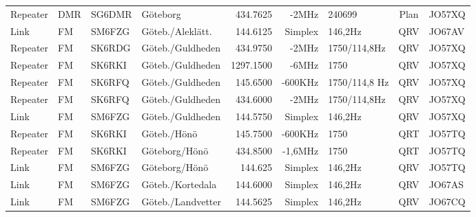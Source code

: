 \begin{landscape}
\begin{longtable}{llllrrlcl}
	Repeater                  & DMR           & SG6DMR        & Göteborg            & 434.7625          & -2MHz          & 240699           & Plan            & JO57XQ           \\
	Link                      & FM            & SM6FZG        & Göteb./Aleklätt.    & 144.6125          & Simplex        & 146,2Hz          & QRV             & JO67AV           \\
	Repeater                  & FM            & SK6RDG        & Göteb./Guldheden    & 434.9750          & -2MHz          & 1750/114,8Hz     & QRV             & JO57XQ           \\
	Repeater                  & FM            & SK6RKI        & Göteb./Guldheden    & 1297.1500         & -6MHz          & 1750             & QRV             & JO57XQ           \\
	Repeater                  & FM            & SK6RFQ        & Göteb./Guldheden    & 145.6500          & -600KHz        & 1750/114,8 Hz    & QRV             & JO57XQ           \\
	Repeater                  & FM            & SK6RFQ        & Göteb./Guldheden    & 434.6000          & -2MHz          & 1750/114,8Hz     & QRV             & JO57XQ           \\
	Link                      & FM            & SM6FZG        & Göteb./Guldheden    & 144.5750          & Simplex        & 146,2Hz          & QRV             & JO57XQ           \\
	Repeater                  & FM            & SK6RKI        & Göteb./Hönö         & 145.7500          & -600KHz        & 1750             & QRT             & JO57TQ           \\
	Repeater                  & FM            & SK6RKI        & Göteborg/Hönö       & 434.8500          & -1,6MHz        & 1750             & QRT             & JO57TQ           \\
	Link                      & FM            & SM6FZG        & Göteborg/Hönö       & 144.625           & Simplex        & 146,2Hz          & QRV             & JO57TQ           \\
	Link                      & FM            & SM6FZG        & Göteb./Kortedala    & 144.6000          & Simplex        & 146,2Hz          & QRV             & JO67AS           \\
	Link                      & FM            & SM6FZG        & Göteb./Landvetter   & 144.5625          & Simplex        & 146,2Hz          & QRV             & JO67CQ           \\

\end{longtable}
\end{landscape}
